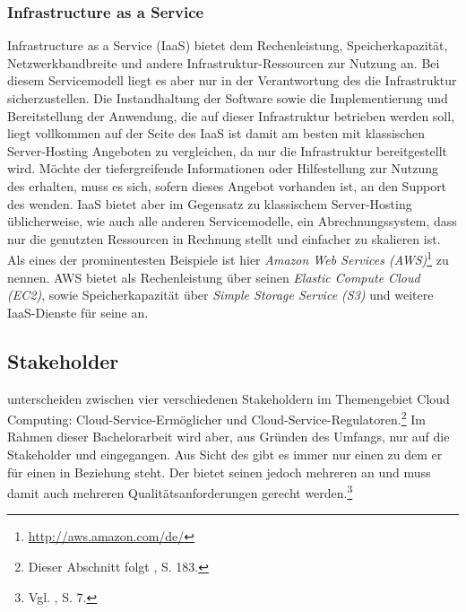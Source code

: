 \subsubsection{Infrastructure as a Service}
Infrastructure as a Service (\acs{IaaS}) bietet dem \CSU Rechenleistung, Speicherkapazität, Netzwerkbandbreite und andere Infrastruktur-Ressourcen zur Nutzung an.\useFN{\MellAbsatz} Bei diesem Servicemodell liegt es aber nur in der Verantwortung des \CSPs die \CC Infrastruktur sicherzustellen. Die Instandhaltung der Software sowie die Implementierung und Bereitstellung der Anwendung, die auf dieser Infrastruktur betrieben werden soll, liegt vollkommen auf der Seite des \CSUsDot
\acs{IaaS} ist damit am besten mit klassischen Server-Hosting Angeboten zu vergleichen, da nur die Infrastruktur  bereitgestellt wird. Möchte der \CSU tiefergreifende Informationen oder Hilfestellung zur Nutzung des \CSs erhalten, muss es sich, sofern dieses Angebot vorhanden ist, an den Support des \CSPs wenden. \acs{IaaS} bietet aber im Gegensatz zu klassischem Server-Hosting üblicherweise, wie auch alle anderen Servicemodelle, ein Abrechnungssystem, dass nur die genutzten Ressourcen in Rechnung stellt und einfacher zu skalieren ist.
\newline
Als eines der prominentesten Beispiele ist hier \emph{Amazon Web Services (\acs{AWS})}\footnote{\url{http://aws.amazon.com/de/}}
zu nennen. AWS bietet als \CSP Rechenleistung über seinen \CS \emph{Elastic Compute Cloud (\acs{EC2})}, sowie Speicherkapazität über \emph{Simple Storage Service (\acs{S3})} und weitere \acs{IaaS}-Dienste für seine \CSU an.

\subsection{Stakeholder}
\cite{Marston.2011} unterscheiden zwischen vier verschiedenen Stakeholdern im Themengebiet Cloud Computing: \CSUComma \CSPComma Cloud-\linebreak Service-Ermöglicher und Cloud-Service-Regulatoren.\footnote{Dieser Abschnitt folgt \cite{Marston.2011}, S. 183.}\saveFN{\Marston}
Im Rahmen dieser Bachelorarbeit wird aber, aus Gründen des Umfangs, nur auf die Stakeholder \CSU und \CSP eingegangen.
\newline
Aus Sicht des \CSUs gibt es immer nur einen \CSP zu dem er für einen \CS in Beziehung steht. Der \CSP bietet seinen \CS jedoch mehreren \CSUn an und muss damit auch mehreren Qualitätsanforderungen gerecht werden.\footnote{Vgl. \cite{Schneider.2013}, S. 7.}

